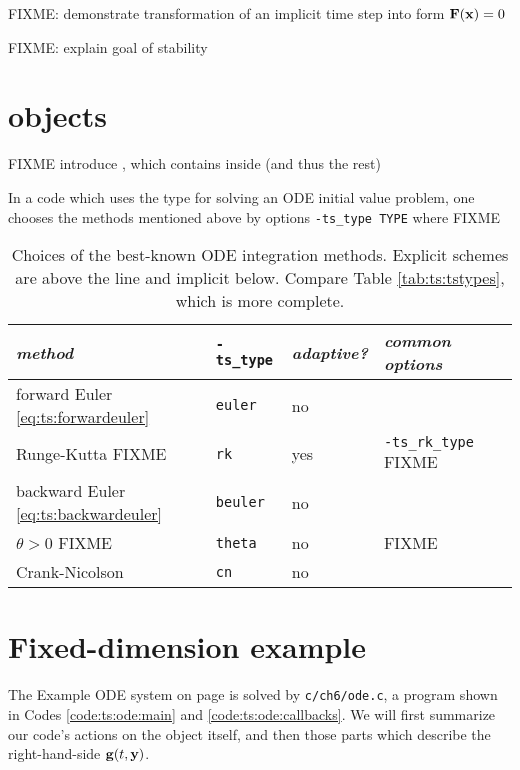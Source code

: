 FIXME: demonstrate transformation of an implicit time step into form $\mathbf{F}(\mathbf{x})=0$

FIXME: explain goal of stability


\section{\PETSc \pTS objects}

FIXME introduce \pTS, which contains \pSNES inside (and thus the rest)

In a \PETSc code which uses the \pTS type for solving an ODE initial value problem, one chooses the methods mentioned above by options \texttt{-ts\_type TYPE} where FIXME

\begin{table}
\small
\begin{tabular}{lllll}
\emph{method}                                & \texttt{-ts\_type} & \emph{adaptive?} & \emph{common options} \\ \hline
forward Euler \eqref{eq:ts:forwardeuler}    & \texttt{euler}  & no & \\
Runge-Kutta  FIXME                          & \texttt{rk}     & yes & \texttt{-ts\_rk\_type} FIXME \\ \hline
backward Euler \eqref{eq:ts:backwardeuler}  & \texttt{beuler} & no & \\
$\theta>0$   FIXME                          & \texttt{theta}  & no & FIXME \\
Crank-Nicolson                              & \texttt{cn}     & no & 
\end{tabular}
\caption{Choices of the best-known ODE integration methods.  Explicit schemes are above the line and implicit below.  Compare Table \ref{tab:ts:tstypes}, which is more complete.} \label{tab:ts:odebasictypes}
\end{table}


\section{Fixed-dimension example }

The Example ODE system on page \pageref{ex:ts:odeeasy} is solved by \texttt{c/ch6/ode.c}, a program shown in Codes \ref{code:ts:ode:main} and \ref{code:ts:ode:callbacks}.  We will first summarize our code's actions on the \pTS object itself, and then those parts which describe the right-hand-side $\mathbf{g}(t,\mathbf{y})$.


